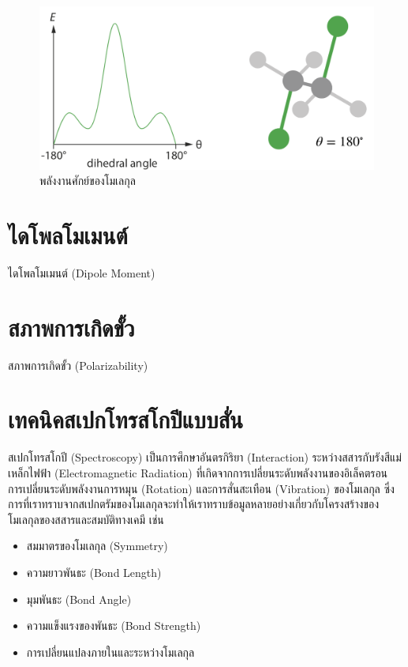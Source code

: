 \begin{figure}[H]
    \centering
    \includegraphics[width=0.8\linewidth]{fig/PES_C2H4Cl2.png}
    \caption{พลังงานศักย์ของโมเลกุล }
    \label{fig:pes_c2h4cl2}
\end{figure}

\section{ไดโพลโมเมนต์}
\label{sec:dipole_moment}

ไดโพลโมเมนต์ (Dipole Moment)


\section{สภาพการเกิดขั้ว}
\label{sec:polariz}

สภาพการเกิดขั้ว (Polarizability)

\section{เทคนิคสเปกโทรสโกปีแบบสั่น}
\label{sec:spectro}

สเปกโทรสโกปี (Spectroscopy) เป็นการศึกษาอันตรกิริยา (Interaction) ระหว่างสสารกับรังสีแม่เหล็กไฟฟ้า (Electromagnetic Radiation) 
ที่เกิดจากการเปลี่ยนระดับพลังงานของอิเล็คตรอน การเปลี่ยนระดับพลังงานการหมุน (Rotation) และการสั่นสะเทือน (Vibration) ของโมเลกุล 
ซึ่งการที่เราทราบจากสเปกตรัมของโมเลกุลจะทำให้เราทราบข้อมูลหลายอย่างเกี่ยวกับโครงสร้างของโมเลกุลของสสารและสมบัติทางเคมี เช่น

\begin{itemize}
    \item สมมาตรของโมเลกุล (Symmetry)
    
    \item ความยาวพันธะ (Bond Length)
    
    \item มุมพันธะ (Bond Angle)
    
    \item ความแข็งแรงของพันธะ (Bond Strength)
    
    \item การเปลี่ยนแปลงภายในและระหว่างโมเลกุล
\end{itemize}

